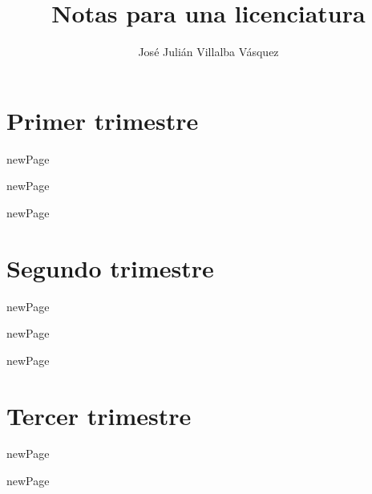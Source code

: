 \documentclass{book}
\title{Notas para una licenciatura}
\author{José Julián Villalba Vásquez}
\begin{document}
\maketitle

\part{Primer trimestre}

\begin{htmlDiv}{newPage}
	
\end{htmlDiv}


\begin{htmlDiv}{newPage}
	
\end{htmlDiv}

\begin{htmlDiv}{newPage}
	
\end{htmlDiv}

\part{Segundo trimestre}

\begin{htmlDiv}{newPage}
	
\end{htmlDiv}

\begin{htmlDiv}{newPage}
	
\end{htmlDiv}

\begin{htmlDiv}{newPage}
	
\end{htmlDiv}

\part{Tercer trimestre}


\begin{htmlDiv}{newPage}
	
\end{htmlDiv}

\begin{htmlDiv}{newPage}
	
\end{htmlDiv}
\end{document}
